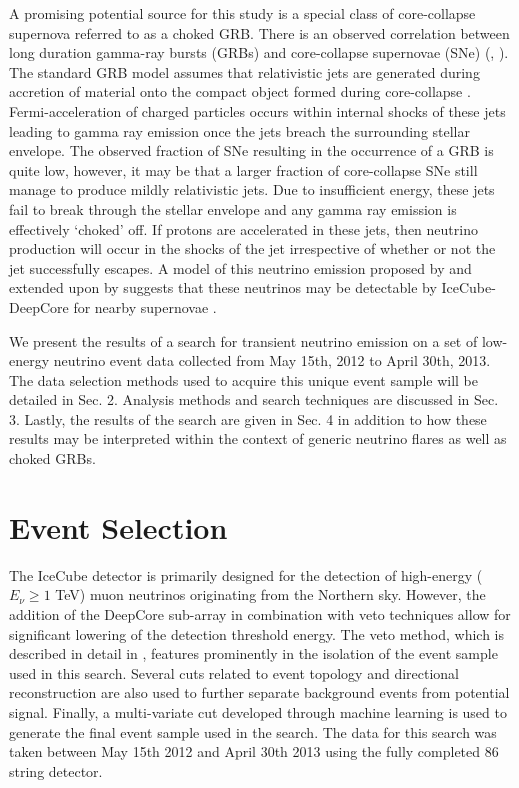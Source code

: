 \documentclass[manuscript]{aastex}
\begin{document}
A promising potential source for this study is a special class of core-collapse supernova referred to as a choked GRB. There is an observed correlation between long duration gamma-ray bursts (GRBs) and core-collapse supernovae (SNe) (\citep{2006ARA&A..44..507W}, \citep{2011AN....332..434M}).  The standard GRB model assumes that relativistic jets are generated during accretion of material onto the compact object formed during core-collapse \citep{1992MNRAS.258P..41R}. Fermi-acceleration of charged particles occurs within internal shocks of these jets leading to gamma ray emission once the jets breach the surrounding stellar envelope.  The observed fraction of SNe resulting in the occurrence of a GRB is quite low, however, it may be that a larger fraction of core-collapse SNe still manage to produce mildly relativistic jets.  Due to insufficient energy, these jets fail to break through the stellar envelope and any gamma ray emission is effectively `choked' off. If protons are accelerated in these jets, then neutrino production will occur in the shocks of the jet irrespective of whether or not the jet successfully escapes. A model of this neutrino emission proposed by \cite{2004PhRvL..93r1101R} and extended upon by \cite{2005PhRvL..95f1103A} suggests that these neutrinos may be detectable by IceCube-DeepCore for nearby supernovae \citep{PhysRevD.81.083011}.

We present the results of a search for transient neutrino emission on a set of low-energy neutrino event data collected from May 15th, 2012 to April 30th, 2013. The data selection methods used to acquire this unique event sample will be detailed in Sec. 2. Analysis methods and search techniques are discussed in Sec. 3. Lastly, the results of the search are given in Sec. 4 in addition to how these results may be interpreted within the context of generic neutrino flares as well as choked GRBs.
\section{Event Selection}
The IceCube detector is primarily designed for the detection of high-energy ($E_{\nu} \geq 1$ TeV) muon neutrinos originating from the Northern sky. However, the addition of the DeepCore sub-array in combination with veto techniques allow for significant lowering of the detection threshold energy. The veto method, which is described in detail in \cite{2012APh....35..615A}, features prominently in the isolation of the event sample used in this search. Several cuts related to event topology and directional reconstruction are also used to further separate background events from potential signal. Finally, a multi-variate cut developed through machine learning is used to generate the final event sample used in the search. The data for this search was taken between May 15th 2012 and April 30th 2013 using the fully completed 86 string detector.
\end{document}
